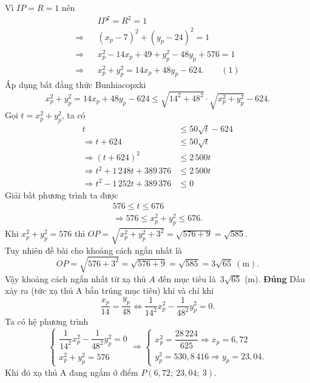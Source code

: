 \begin{ex}
{\begin{itemchoice}
			Vì  $IP = R = 1$ nên
			\begin{eqnarray*}
				& & IP^2  = R^2 = 1 \\
				\Rightarrow & &(x_p - 7)^2  + (y_p - 24)^2 = 1 \\
				\Rightarrow & &x_p^2 - 14x_p +  49 + y_p^2 - 48y_p + 576 = 1 \\
				\Rightarrow & &x_p^2 +  y_p^2 = 14x_p + 48y_p - 624. \qquad(1)
			\end{eqnarray*}
			 Áp dụng bất đẳng thức Bunhiacopxki
			 $$
			x_p^2 + y_p^2 = 14x_p + 48y_p - 624 \leq \sqrt{14^2 + 48^2}  \cdot \sqrt{x_p^2 + y_p^2} - 624.
			$$ 
			 Gọi $t = x_p^2 + y_p^2$, ta có
			\begin{align*}
				t  &\leq 50\sqrt{t} - 624 \\
				\Rightarrow t + 624 &\leq  50\sqrt{t} \\
				 \Rightarrow (t + 624)^2 &\leq 2\,500t \\
				\Rightarrow t^2 +  1\,248t + 389\,376 &\leq 2\,500t \\
				\Rightarrow t^2 - 1\,252t  + 389\,376 &\leq 0
			\end{align*}
			Giải bất  phương trình ta được
			\begin{align*}
				 576 \leq t \leq 676 \\
				\Rightarrow 576 \leq  x_p^2 + y_p^2 \leq 676.
			\end{align*}
			Khi $x_p^2  + y_p^2 = 576$ thì $OP = \sqrt{x_p^2 + y_p^2 + 3^2} = \sqrt{576 + 9} = \sqrt{585}$.\\
			Tuy nhiên đề bài cho khoảng cách ngắn nhất là~$$OP = \sqrt{576 + 3^2} = \sqrt{576 + 9} = \sqrt{585} = 3\sqrt{65}  \ (\text{m}).$$
			Vậy khoảng cách ngắn nhất từ  xạ thủ $A$ đến mục tiêu là~$3\sqrt{65}$ (m).
			\itemch \textbf{Đúng} 
			Dấu  xảy ra (tức xạ thủ A bắn trúng mục tiêu) khi và chỉ khi
			$$ 
			 \dfrac{x_p}{14} = \dfrac{y_p}{48} \Leftrightarrow \dfrac{1}{14^2} x_p^2 - \dfrac{1}{48^2} y_p^2 = 0.
			 $$
			 Ta có hệ phương trình
			$$ 
			\begin{cases}
				\dfrac{1}{14^2} x_p^2 -  \dfrac{1}{48^2} y_p^2 = 0 \\
				x_p^2 +  y_p^2 = 576
			\end{cases}
			 \Rightarrow
			\begin{cases}
				x_p^2 = \dfrac{28\,224}{625}  \Rightarrow x_p = 6{,}72 \\
				y_p^2 = 530{,}8\,416 \Rightarrow y_p =  23{,}04.
			\end{cases}
			$$ 
			Khi đó xạ thủ A đang ngắm  ở điểm $P(6{,}72;\ 23{,}04;\ 3)$.\\

\end{itemchoice}}
\end{ex}
